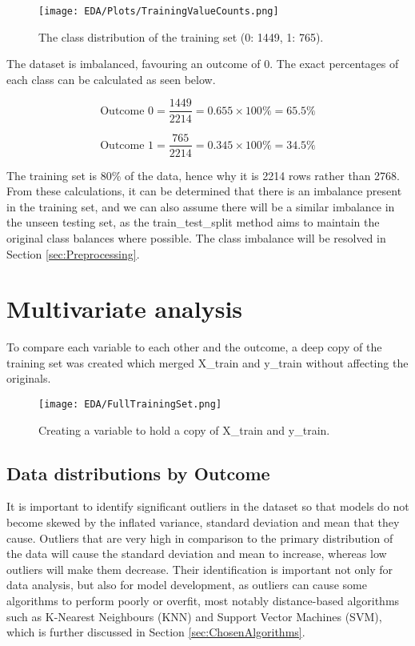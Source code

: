 \begin{figure}[H]
    \centering
    \texttt{[image: EDA/Plots/TrainingValueCounts.png]}
    \caption{The class distribution of the training set (0: 1449, 1: 765).}
    \label{fig:ClassImbalancePlot}
\end{figure}

\para The dataset is imbalanced, favouring an outcome of 0. The exact percentages 
of each class can be calculated as seen below.

\begin{equation}
    \text{Outcome 0} = \frac{1449}{2214} = 0.655 \times 100\% = 65.5\%
\end{equation}

\begin{equation}
    \text{Outcome 1} = \frac{765}{2214} = 0.345 \times 100\% = 34.5\%
\end{equation}

\para The training set is 80\% of the data, hence why it is 2214 rows rather than 2768. From these calculations, it can be determined that 
there is an imbalance present in the training set, and we can also assume there will be a similar imbalance in the unseen testing set, as the train\_test\_split method 
aims to maintain the original class balances where possible. The class imbalance will be resolved in Section \ref{sec:Preprocessing}.



\section{Multivariate analysis}
To compare each variable to each other and the outcome, a deep copy of the training 
set was created which merged X\_train and y\_train without affecting the originals.

\begin{figure}[H]
    \centering
    \texttt{[image: EDA/FullTrainingSet.png]}
    \caption{Creating a variable to hold a copy of X\_train and y\_train.}
    \label{fig:FullTrainingSet}
\end{figure}

\subsection{Data distributions by Outcome}

It is important to identify significant outliers in the dataset so that models do not become skewed by the inflated variance, standard 
deviation and mean that they cause. Outliers that are very high in comparison to the primary distribution of the data will cause the 
standard deviation and mean to increase, whereas low outliers will make them decrease. Their identification is important not only for data analysis, 
but also for model development, as outliers can cause some algorithms to perform poorly or overfit, most notably distance-based algorithms 
such as K-Nearest Neighbours (KNN) and Support Vector Machines (SVM), which is further discussed in Section \ref{sec:ChosenAlgorithms}. 

